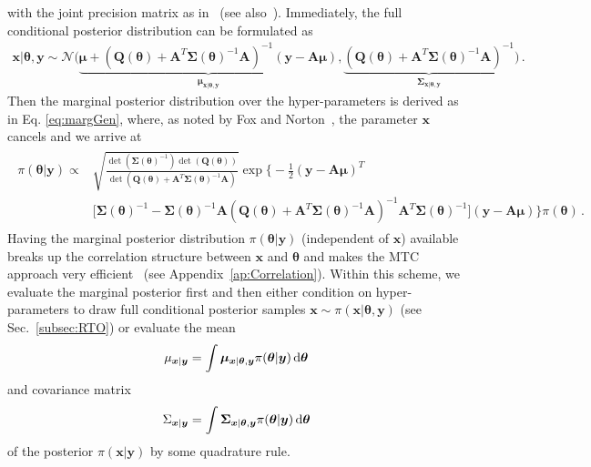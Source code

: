 with the joint precision matrix as in~\cite{SIMPSON201216} (see also~\cite{rue2005gaussian, fox2016fast}).
Immediately, the full conditional posterior distribution can be formulated as 
\begin{align}
	\bm{x} | \bm{\theta} , \bm{y}\sim \mathcal{N}\big(\underbrace{ \bm{\mu} + (\bm{Q}(\bm{\theta}) + \bm{A}^T \bm{\Sigma}(\bm{\theta})^{-1} \bm{A})^{-1}(\bm{y} - \bm{A}\bm{\mu})}_{\bm{\mu}_{\bm{x} | \bm{\theta} , \bm{y}}},\underbrace{ (\bm{Q}(\bm{\theta}) + \bm{A}^T \bm{\Sigma}(\bm{\theta})^{-1} \bm{A})^{-1}}_{\bm{\Sigma}_{\bm{x} | \bm{\theta} , \bm{y}}} \big)\, \label{eq:CondPostLin}.
\end{align}
Then the marginal posterior distribution over the hyper-parameters is derived as in Eq. \ref{eq:margGen}, where, as noted by Fox and Norton~\cite{fox2016fast}, the parameter $\bm{x}$ cancels and we arrive at
\begin{align}\begin{split}
		\pi(\bm{\theta} | \bm{y}) \propto & \sqrt{\frac{\det{(\bm{\Sigma}(\bm{\theta})^{-1})} \det{(\bm{Q}(\bm{\theta}))} }{\det{(\bm{Q}(\bm{\theta}) + \bm{A}^T \bm{\Sigma}(\bm{\theta})^{-1} \bm{A})} } }  \exp \Bigg\{  -\frac{1}{2} (\bm{y} - \bm{A} \bm{\mu})^T \\ &\big[ \bm{\Sigma}(\bm{\theta})^{-1} - \bm{\Sigma}(\bm{\theta})^{-1} \bm{A}  (\bm{Q}(\bm{\theta}) + \bm{A}^T \bm{\Sigma}(\bm{\theta})^{-1} \bm{A})^{-1} \bm{A}^T \bm{\Sigma} (\bm{\theta})^{-1} \big] (\bm{y} - \bm{A} \bm{\mu}) \Bigg\} \pi(\bm{\theta}) \, .
	\end{split} 
\end{align} 
Having the marginal posterior distribution $\pi (\bm{\theta}| \bm{y})$ (independent of $\bm{x}$) available breaks up the correlation structure between $\bm{x}$ and $\bm{\theta}$ and makes the MTC approach very efficient~\cite{fox2016fast} (see Appendix~\ref{ap:Correlation}).
Within this scheme, we evaluate the marginal posterior first and then either condition on hyper-parameters to draw full conditional posterior samples $\bm{x} \sim \pi (\bm{x} | \bm{\theta}, \bm{y})$ (see Sec.~\ref{subsec:RTO}) or evaluate the mean
\begin{align}
	\mu_{\bm{x}|\bm{y}} = \int \bm{\mu}_{\bm{x} | \bm{\theta} , \bm{y}} \pi(\bm{\theta}| \bm{y}) \mathop{}\!\mathrm{d} \bm{\theta} \label{eq:MeanGenInt}
\end{align} and covariance matrix
\begin{align}
	\Sigma_{\bm{x}|\bm{y}} = \int \bm{\Sigma}_{\bm{x} | \bm{\theta} , \bm{y}} \pi(\bm{\theta}| \bm{y}) \mathop{}\!\mathrm{d} \bm{\theta}\label{eq:CoVarGenInt}
\end{align}
of the posterior $\pi(\bm{x}| \bm{y})$ by some quadrature rule.


